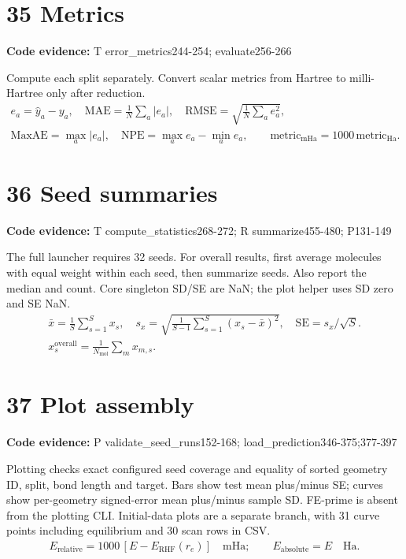 \documentclass[10pt,a4paper]{article}
\newcommand{\stage}[2]{\section*{#1}\textbf{Code evidence:} #2\par}
\begin{document}
\par\noindent\begin{minipage}{\linewidth}
\stage{35 Metrics}{T error\_metrics244-254; evaluate256-266}
Compute each split separately. Convert scalar metrics from Hartree to milli-Hartree only after reduction.
\[
\begin{gathered}
e_a=\widehat y_a-y_a,\quad \mathrm{MAE}=\frac1N\sum_a|e_a|,\quad \mathrm{RMSE}=\sqrt{\frac1N\sum_ae_a^2},\\ \mathrm{MaxAE}=\max_a|e_a|,\quad \mathrm{NPE}=\max_ae_a-\min_ae_a,\qquad \mathrm{metric}_{\mathrm{mHa}}=1000\,\mathrm{metric}_{\mathrm{Ha}}.
\end{gathered}
\]
\end{minipage}\par\vspace{4pt}
\par\noindent\begin{minipage}{\linewidth}
\stage{36 Seed summaries}{T compute\_statistics268-272; R summarize455-480; P131-149}
The full launcher requires 32 seeds. For overall results, first average molecules with equal weight within each seed, then summarize seeds. Also report the median and count. Core singleton SD/SE are NaN; the plot helper uses SD zero and SE NaN.
\[
\begin{gathered}
\bar x=\frac1S\sum_{s=1}^Sx_s,\quad s_x=\sqrt{\frac1{S-1}\sum_{s=1}^S(x_s-\bar x)^2},\quad \mathrm{SE}=s_x/\sqrt S.\\ x_s^{\mathrm{overall}}=\frac1{N_{\mathrm{mol}}}\sum_mx_{m,s}.
\end{gathered}
\]
\end{minipage}\par\vspace{4pt}
\par\noindent\begin{minipage}{\linewidth}
\stage{37 Plot assembly}{P validate\_seed\_runs152-168; load\_prediction346-375;377-397}
Plotting checks exact configured seed coverage and equality of sorted geometry ID, split, bond length and target. Bars show test mean plus/minus SE; curves show per-geometry signed-error mean plus/minus sample SD. FE-prime is absent from the plotting CLI. Initial-data plots are a separate branch, with 31 curve points including equilibrium and 30 scan rows in CSV.
\[
\begin{gathered}
E_{\mathrm{relative}}=1000\,[E-E_{\mathrm{RHF}}(r_e)]\quad\mathrm{mHa};\qquad E_{\mathrm{absolute}}=E\quad\mathrm{Ha}.
\end{gathered}
\]
\end{minipage}\par\vspace{4pt}
\end{document}
